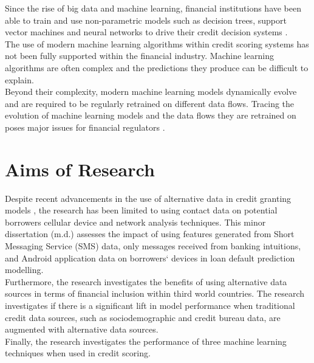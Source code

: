 Since the rise of big data and machine learning, financial institutions have been able to train and use non-parametric models such as decision trees, support vector machines and neural networks to drive their credit decision systems \parencite{IntroToCreditModelling}. \\

The use of modern machine learning algorithms within credit scoring systems has not been fully supported within the financial industry. Machine learning algorithms are often complex and the predictions they produce can be difficult to explain. \\

Beyond their complexity, modern machine learning models dynamically evolve and are required to be regularly retrained on different data flows. Tracing the evolution of machine learning models and the data flows they are retrained on poses major issues for financial regulators \parencite{Regulation}. \\


\section{Aims of Research}

Despite recent advancements in the use of alternative data in credit granting models \parencite{BigDataMicroFiance}, the research has been limited to using contact data on potential borrowers cellular device and network analysis techniques. This minor dissertation (m.d.) assesses the impact of using features generated from Short Messaging Service (SMS) data, only messages received from banking intuitions, and Android application data on borrowers` devices in loan default prediction modelling. \\

Furthermore, the research investigates the benefits of using alternative data sources in terms of financial inclusion within third world countries. The research investigates if there is a significant lift in model performance when traditional credit data sources, such as sociodemographic and credit bureau data, are augmented with alternative data sources.  \\

Finally, the research investigates the performance of three machine learning techniques when used in credit scoring.  


